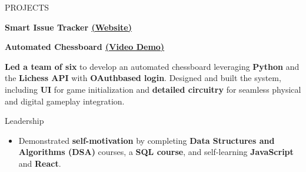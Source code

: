 \documentclass{resume} %
\begin{document}

\begin{rSection}{PROJECTS}
\vspace{-0.825 em}


\item \textbf{Smart Issue Tracker \href{https://issue-tracker-kappa-nine.vercel.app/}{(Website)}} 
\vspace{0.4em}

\vspace{0.4em}



\item \textbf{Automated Chessboard \href{https://youtu.be/hdualDzNvGY}{(Video Demo)}} \vspace{-0.1em} {

\item \textbf{Led a team of six} to develop an automated chessboard leveraging \textbf{Python} and the \textbf{Lichess API} with \textbf{OAuthbased login}. Designed and built the system, including \textbf{UI} for game initialization and \textbf{detailed circuitry} for seamless
physical and digital gameplay integration.



}

\end{rSection}



\begin{rSection}{Leadership} 
\begin{itemize}


    \item Demonstrated \textbf{self-motivation} by completing \textbf{Data Structures and Algorithms (DSA)} courses, a \textbf{SQL course}, and self-learning \textbf{JavaScript} and \textbf{React}.


\end{itemize}
\end{rSection}
\end{document}
